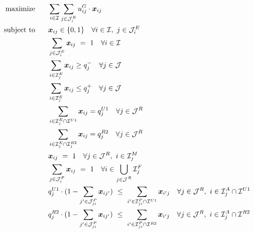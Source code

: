 \documentclass{article}
\begin{document}
\vspace{-20pt}
\begin{subequations}
    \begin{flalign}
        \mbox{maximize}\hspace{0.25in} & \displaystyle\sum_{i \in \mathcal{I}} \displaystyle\sum_{j \in \mathcal{J}^{E}_i} u^{G}_{ij} \cdot \bm{{x}}_{ij}\label{eqn:vft_obj_fn}\\
        \mbox{subject to}\hspace{0.25in} & \bm{x}_{ij} \in \{0,1\}  \ \ \ \forall i \in \mathcal{I}, \ j \in \mathcal{J}^{E}_i\label{eqn:vft_xbinary}\\
        & \sum_{j \in \mathcal{J}^{E}_i} \textbf{\textit{x}}_{ij} \ = \ 1 \ \ \ \forall i \in \mathcal{I} \label{eqn:vft_one_afsc} \\
        & \displaystyle\sum_{i \in \mathcal{I}^{E}_j} \bm{x}_{ij} \geq q^{-}_j \ \ \ \forall j \in \mathcal{J}\label{eqn:vft_min_obj_value}\\
        & \displaystyle\sum_{i \in \mathcal{I}^{E}_j} \bm{x}_{ij} \leq q^{+}_j \ \ \ \forall j \in \mathcal{J}\label{eqn:vft_min_obj_value}\\
        & \displaystyle\sum_{i \in \mathcal{I}^{E}_j \cap \mathcal{I}^{U1}} \bm{x}_{ij} = q^{U1}_j \ \ \ \forall j \in \mathcal{J}^R\label{eqn:vft_min_obj_value}\\
        & \displaystyle\sum_{i \in \mathcal{I}^{E}_j \cap \mathcal{I}^{R2}_j} \bm{x}_{ij} = q^{R2}_j \ \ \ \forall j \in \mathcal{J}^R\label{eqn:vft_min_obj_value}\\
        & \bm{x}_{ij} \ = \ 1 \ \ \ \forall j \in \mathcal{J}^R, \ i \in \mathcal{I}^{M}_j \\
         & \sum_{j \in \mathcal{J}^{F}_i} \bm{x}_{ij} \ = \ 1 \ \ \ \forall i \in \bigcup_{\substack{j\in \mathcal{J}^R}}\mathcal{I}^{F}_{j}\\
    & q^{U1}_j \cdot (1 - \sum_{j' \in \mathcal{J}^{P}_{ji}} \bm{x}_{ij'}) \ \leq \ \sum_{i' \in \mathcal{I}^{P}_{ji}\cap \mathcal{I}^{U1}} \bm{x}_{i'j} \ \ \ \forall j \in \mathcal{J}^{R}, \ i \in \mathcal{I}^{A}_j \cap \mathcal{I}^{U1}\\
    & q^{R2}_j \cdot (1 - \sum_{j' \in \mathcal{J}^{P}_{ji}} \bm{x}_{ij'}) \ \leq \ \sum_{i' \in \mathcal{I}^{P}_{ji}\cap \mathcal{I}^{R2}} \bm{x}_{i'j} \ \ \ \forall j \in \mathcal{J}^{R}, \ i \in \mathcal{I}^{A}_j \cap \mathcal{I}^{R2}
    \end{flalign}
\end{subequations}
\end{document}
